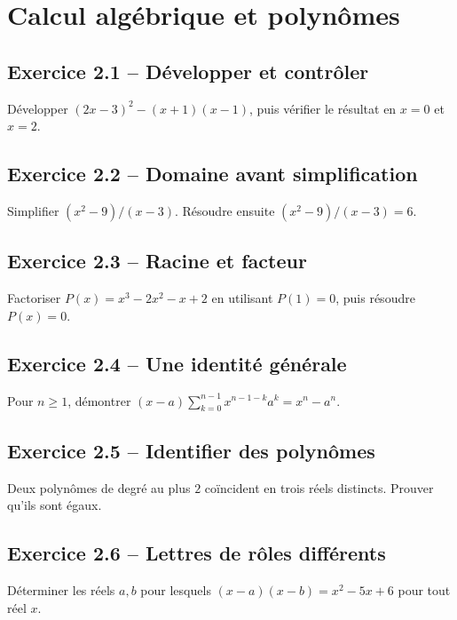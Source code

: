 \chapter{Calcul algébrique et polynômes}
\section*{Exercice 2.1 -- Développer et contrôler}
Développer $(2x-3)^2-(x+1)(x-1)$, puis vérifier le résultat en $x=0$ et $x=2$.

\section*{Exercice 2.2 -- Domaine avant simplification}
Simplifier $(x^2-9)/(x-3)$. Résoudre ensuite $(x^2-9)/(x-3)=6$.

\section*{Exercice 2.3 -- Racine et facteur}
Factoriser $P(x)=x^3-2x^2-x+2$ en utilisant $P(1)=0$, puis résoudre $P(x)=0$.

\section*{Exercice 2.4 -- Une identité générale}
Pour $n\ge1$, démontrer $(x-a)\sum_{k=0}^{n-1}x^{n-1-k}a^k=x^n-a^n$.

\section*{Exercice 2.5 -- Identifier des polynômes}
Deux polynômes de degré au plus $2$ coïncident en trois réels distincts. Prouver qu'ils sont égaux.

\section*{Exercice 2.6 -- Lettres de rôles différents}
Déterminer les réels $a,b$ pour lesquels $(x-a)(x-b)=x^2-5x+6$ pour tout réel $x$.
